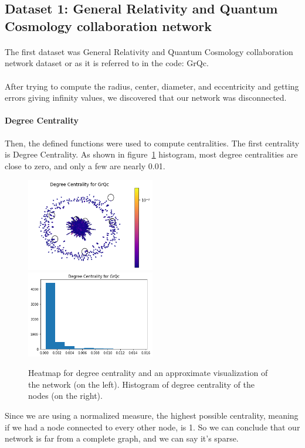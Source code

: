 \documentclass[letterpaper, 11pt]{article}
\newcommand{\1}{\mathds{1}}	%
\theoremstyle{definition}
\begin{document}
\subsection*{Dataset 1: General Relativity and Quantum Cosmology collaboration network}
\paragraph{}The first dataset was General Relativity and Quantum Cosmology collaboration network dataset or as it is referred to in the code:  GrQc.
\paragraph{}After trying to compute the radius, center, diameter, and eccentricity and getting errors giving infinity values, we discovered that our network was disconnected.
\paragraph{Degree Centrality}Then, the defined functions were used to compute centralities. The first centrality is Degree Centrality. As shown in figure~\ref{fig:d_cent} histogram, most degree centralities are close to zero, and only a few are nearly 0.01. 
\begin{figure}[h]
\includegraphics[width=0.5\textwidth]{GrQc_d_cent.png}
\includegraphics[width=0.5\textwidth]{GrQc_d_cent_hist.png}
\captionsetup{justification=centering,margin=0.5cm}
\caption{Heatmap for degree centrality and an approximate visualization of the network (on the left). Histogram of degree centrality of the nodes (on the right).}
\label{fig:d_cent}
\end{figure}
Since we are using a normalized measure, the highest possible centrality, meaning if we had a node connected to every other node, is 1. So we can conclude that our network is far from a complete graph, and we can say it's sparse.
\end{document}
